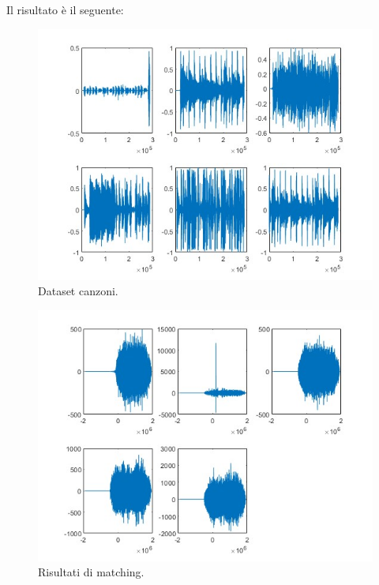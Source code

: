 \documentclass[a4paper]{article}
\begin{document}
	\noindent
	Il risultato è il seguente:
	
	\noindent
	\begin{figure}[!htp]
		\centering
		\includegraphics[width=.9\textwidth]{img/lab/cross-correlazione-8.jpg}
		\caption{Dataset canzoni.}
	\end{figure}
	\begin{figure}[!htp]
		\centering
		\includegraphics[width=.9\textwidth]{img/lab/cross-correlazione-9.jpg}
		\caption{Risultati di matching.}
	\end{figure}\newpage
	
\end{document}
